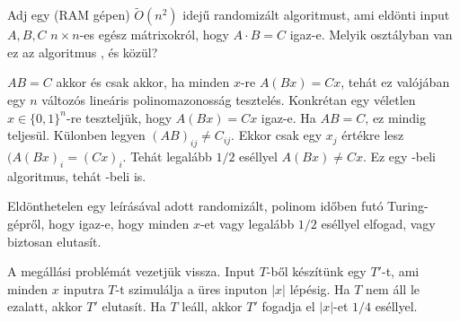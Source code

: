 \begin{Exercise}[counter={sorszam}, difficulty=0]
	Adj egy (RAM g\'epen) $\tilde O(n^2)$ idej\H u randomiz\'alt algoritmust, ami eld\"onti input $A,B,C$ $n\times n$-es eg\'esz m\'atrixokr\'ol, hogy $A\cdot B=C$ igaz-e. Melyik oszt\'alyban van ez az algoritmus \RP, \coRP \'es \BPP k\"oz\"ul?
\end{Exercise}	
\begin{Answer}
	$AB=C$ akkor \'es csak akkor, ha minden $x$-re $A(Bx)=Cx$, teh\'at ez val\'oj\'aban egy $n$ v\'altoz\'os line\'aris polinomazonoss\'ag tesztel\'es.
	Konkr\'etan egy v\'eletlen $x\in \{0,1\}^n$-re tesztelj\"uk, hogy $A(Bx)=Cx$ igaz-e.
	Ha $AB=C$, ez mindig teljes\"ul.
	K\"ulonben legyen $(AB)_{ij}\ne C_{ij}$.
	Ekkor csak egy $x_j$ \'ert\'ekre lesz $(A(Bx)_i=(Cx)_i$.
	Teh\'at legal\'abb $1/2$ es\'ellyel $A(Bx)\ne Cx$.
	Ez egy \coRP-beli algoritmus, teh\'at \BPP-beli is.
\end{Answer}



\begin{Exercise}[counter={sorszam}, difficulty=0]
	Eld\"onthetelen egy le\'ir\'as\'aval adott randomiz\'alt, polinom id\H oben fut\'o Turing-g\'epr\H ol, hogy igaz-e, hogy
	minden $x$-et vagy legal\'abb $1/2$ es\'ellyel elfogad, vagy biztosan elutas\'it.
\end{Exercise}	
\begin{Answer}
	A meg\'all\'asi probl\'em\'at vezetj\"uk vissza.
	Input $T$-b\H ol k\'esz\'it\"unk egy $T'$-t, ami minden $x$ inputra $T$-t szimul\'alja a \"ures inputon $|x|$ l\'ep\'esig.
	Ha $T$ nem \'all le ezalatt, akkor $T'$ elutas\'it.
	Ha $T$ le\'all, akkor $T'$ fogadja el $|x|$-et $1/4$ es\'ellyel.
\end{Answer}


